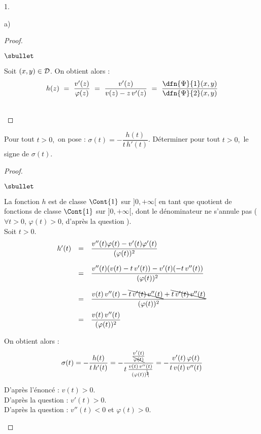 \begin{noliste}{1.}
\begin{noliste}{a)}
\begin{proof}
\begin{noliste}{$\sbullet$}
    \item Soit $(x,y) \in {\cal D}$. On obtient alors :
    \[
     h(z) \ = \ \dfrac{v'(z)}{\varphi(z)}
     \ = \ \dfrac{v'(z)}{v(z) - z \, v'(z)}
     \ = \ \dfrac{\dfn{\Psi}{1}(x,y)}{\dfn{\Psi}{2}(x,y)}
    \]
   \end{noliste}
   ~\\[-1cm]
  \end{proof}

  
  \item Pour tout $t>0,$ on pose : $\sigma(t)=-\dfrac{h(t)}{t \, 
  h'(t)}$. Déterminer pour tout $t>0,$ le signe de $\sigma(t)$.
  
  \begin{proof}~
   \begin{noliste}{$\sbullet$}
    \item La fonction $h$ est de classe $\Cont{1}$ sur 
    $]0,+\infty[$ en tant que quotient de fonctions de classe 
    $\Cont{1}$ sur $]0,+\infty[$, dont le dénominateur ne s'annule
    pas
    ($\forall t>0$, $\varphi(t) >0$, d'après la question 
    ).\\
    Soit $t>0$.
    \[
     \begin{array}{rcl}
      h'(t) &=& \dfrac{v''(t) \varphi(t) - v'(t) \varphi'(t)}
      {(\varphi(t))^2}
      \\[.6cm]
      &=& \dfrac{v''(t) (v(t) - t \, v'(t)) 
      - v'(t) (-t \, v''(t))}
      {(\varphi(t))^2}
      \\[.6cm]
      &=& \dfrac{v(t) \, v''(t) - \bcancel{t \, v'(t) \, v''(t)} 
      + \bcancel{t \, v'(t) \, v''(t)}}
      {(\varphi(t))^2}
      \\[.4cm]
      &=& \dfrac{v(t) \, v''(t)}{(\varphi(t))^2}
     \end{array}
    \]
    
    \item On obtient alors :
    \[
     \sigma(t) = - \dfrac{h(t)}{t\, h'(t)} = -
     \dfrac{\frac{v'(t)}{\bcancel{\varphi(t)}}}
     {t \, \frac{v(t) \, v''(t)}{(\varphi(t))^{\bcancel{2}}}}
     = - \dfrac{v'(t) \, \varphi(t)}
     {t \, v(t) \, v''(t)}
    \]

    \item D'après l'énoncé : $v(t) >0$.\\
    D'après la question  : $v'(t)>0$.\\
    D'après la question  : $v''(t)<0$ et
    $\varphi(t) >0$.
    ~\\[-1.4cm]
   \end{noliste}
  \end{proof}
 \end{noliste}
 

\end{noliste}
